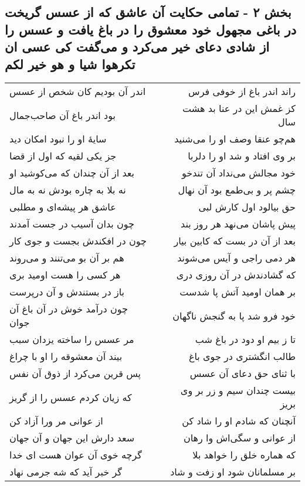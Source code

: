 \begin{center}
\section*{بخش ۲ - تمامی حکایت آن عاشق که از عسس گریخت در باغی مجهول خود معشوق را در باغ یافت و عسس را از شادی دعای خیر می‌کرد و می‌گفت کی عسی ان تکرهوا  شیا و هو خیر لکم}
\label{sec:sh002}
\begin{longtable}{l p{0.5cm} r}
اندر آن بودیم کان شخص از عسس
&&
راند اندر باغ از خوفی فرس
\\
بود اندر باغ آن صاحب‌جمال
&&
کز غمش این در عنا بد هشت سال
\\
سایهٔ او را نبود امکان دید
&&
هم‌چو عنقا وصف او را می‌شنید
\\
جز یکی لقیه که اول از قضا
&&
بر وی افتاد و شد او را دلربا
\\
بعد از آن چندان که می‌کوشید او
&&
خود مجالش می‌نداد آن تندخو
\\
نه بلا به چاره بودش نه به مال
&&
چشم پر و بی‌طمع بود آن نهال
\\
عاشق هر پیشه‌ای و مطلبی
&&
حق بیالود اول کارش لبی
\\
چون بدان آسیب در جست آمدند
&&
پیش پاشان می‌نهد هر روز بند
\\
چون در افکندش بجست و جوی کار
&&
بعد از آن در بست که کابین بیار
\\
هم بر آن بو می‌تنند و می‌روند
&&
هر دمی راجی و آیس می‌شوند
\\
هر کسی را هست اومید بری
&&
که گشادندش در آن روزی دری
\\
باز در بستندش و آن درپرست
&&
بر همان اومید آتش پا شدست
\\
چون درآمد خوش در آن باغ آن جوان
&&
خود فرو شد پا به گنجش ناگهان
\\
مر عسس را ساخته یزدان سبب
&&
تا ز بیم او دود در باغ شب
\\
بیند آن معشوقه را او با چراغ
&&
طالب انگشتری در جوی باغ
\\
پس قرین می‌کرد از ذوق آن نفس
&&
با ثنای حق دعای آن عسس
\\
که زیان کردم عسس را از گریز
&&
بیست چندان سیم و زر بر وی بریز
\\
از عوانی مر ورا آزاد کن
&&
آنچنان که شادم او را شاد کن
\\
سعد دارش این جهان و آن جهان
&&
از عوانی و سگی‌اش وا رهان
\\
گرچه خوی آن عوان هست ای خدا
&&
که هماره خلق را خواهد بلا
\\
گر خبر آید که شه جرمی نهاد
&&
بر مسلمانان شود او زفت و شاد

\end{longtable}
\end{center}

